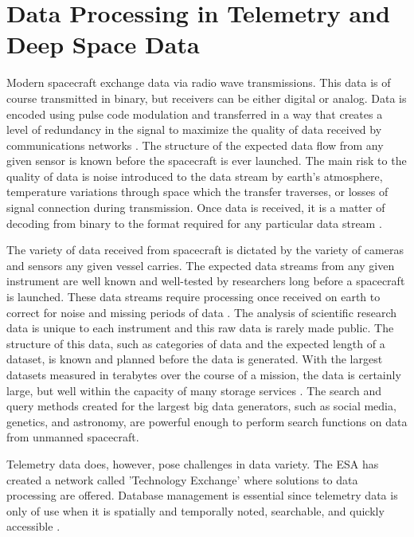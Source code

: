 \documentclass[sigconf]{acmart}
\begin{document}
\section{Data Processing in Telemetry and Deep Space Data}
Modern spacecraft exchange data via radio wave transmissions. This data is of course transmitted in binary, but receivers can be either digital or analog. Data is encoded using pulse code modulation and transferred in a way that creates a level of redundancy in the signal to maximize the quality of data received by communications networks \cite{AndrewODea2013}. The structure of the expected data flow from any given sensor is known before the spacecraft is ever launched. The main risk to the quality of  data is noise introduced to the data stream by earth's atmosphere, temperature variations through space which the transfer traverses, or losses of signal connection during transmission. Once data is received, it is a matter of decoding from binary to the format required for any particular data stream \cite{Metry2013,Cola2011}.


The variety of data received from spacecraft is dictated by the variety of cameras and sensors any given vessel carries. The expected data streams from any given instrument are well known and well-tested by researchers long before a spacecraft is launched. These data streams require processing once received on earth to correct for noise and missing periods of data \cite{Pages2013}. The analysis of scientific research data is unique to each instrument and this raw data is rarely made public. The structure of this data, such as categories of data and the expected length of a dataset, is known and planned before the data is generated. With the largest datasets measured in terabytes over the course of a mission, the data is certainly large, but well within the capacity of many storage services \cite{Jacobson2016}. The search and query methods created for the largest big data generators, such as social media, genetics, and astronomy, are powerful enough to perform search functions on data from unmanned spacecraft.


Telemetry data does, however, pose challenges in data variety. The ESA has created a network called 'Technology Exchange' where solutions to data processing are offered. Database management is essential since telemetry data is only of use when it is spatially and temporally noted, searchable, and quickly accessible \cite{Metry2013}. 
\end{document}
